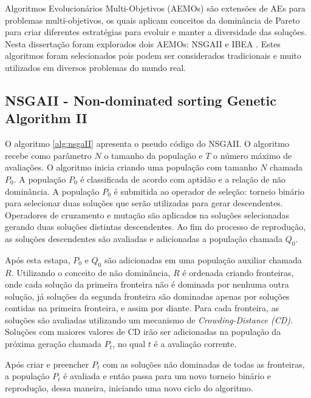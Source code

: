 Algoritmos Evolucionários Multi-Objetivos (AEMOs) são extensões de AEs para problemas multi-objetivos, os quais aplicam
conceitos da dominância de Pareto para criar diferentes estratégias para evoluir e manter a diversidade das soluções.
Nesta dissertação foram explorados dois AEMOs: NSGAII \cite{deb2002fast} e IBEA \cite{zitzler2004indicator}. Estes algoritmos foram selecionados pois podem ser considerados tradicionais e muito utilizados em diversos problemas do mundo real.

\subsection{NSGAII - Non-dominated sorting Genetic Algorithm II}
\label{subsection:nsgaii}

O algoritmo \ref{alg:nsgaII} apresenta o pseudo código do NSGAII. O algoritmo recebe como parâmetro $N$ o tamanho da população e $T$ o número máximo 
de avaliações. O algoritmo inicia criando uma população com tamanho $N$ chamada $P_0$. A população $P_0$ é classificada de acordo com aptidão 
e a relação de não dominância. A população $P_0$ é submitida ao operador de seleção: torneio binário para selecionar duas soluções que serão utilizadas
para gerar descendentes. Operadores de cruzamento e mutação são aplicados na soluções selecionadas gerando duas soluções distintas descendentes. 
Ao fim do processo de reprodução, as soluções descendentes são avaliadas e adicionadas a população chamada $Q_0$.

Após esta estapa, $P_0$ e $Q_0$ são adicionadas em uma população auxiliar chamada $R$. Utilizando o conceito de não dominância, $R$ é ordenada 
criando fronteiras, onde cada solução da primeira fronteira não é dominada por nenhuma outra solução, já soluções da segunda fronteira são dominadas
apenas por soluções contidas na primeira fronteira, e assim por diante. Para cada fronteira, as soluções são avaliadas utilizando um mecanismo
de \textit{Crowding-Distance (CD)}. Soluções com maiores valores de CD irão ser adicionadas na população da próxima geração chamada $P_t$, no qual $t$ é a
avaliação corrente.

Após criar e preencher $P_t$ com as soluções não dominadas de todas as fronteiras, a população $P_t$ é avaliada e então passa para um novo
torneio binário e reprodução, dessa maneira, iniciando uma novo ciclo do algoritmo.

